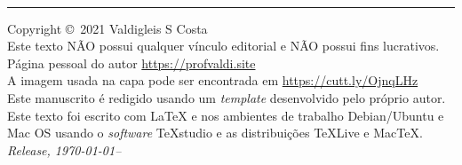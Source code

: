 
\newpage
~\vfill
\thispagestyle{empty}

\hrule
\vspace*{1cm}
\noindent Copyright \copyright\ 2021 Valdigleis S Costa\\ %

\noindent Este texto  \textsc{NÃO}  possui qualquer vínculo editorial e \textsc{NÃO} possui fins lucrativos.\\ %

\noindent Página pessoal do autor \url{https://profvaldi.site}\\ 

\noindent A imagem usada na capa pode ser encontrada em \url{https://cutt.ly/OjnqLHz}\\


\noindent Este manuscrito é redigido usando um \textit{template} desenvolvido pelo próprio autor. Este texto foi escrito com {\LaTeX} e {\LaTeXe} nos ambientes de trabalho Debian/Ubuntu e Mac OS usando o \textit{software} TeXstudio e as distribuições  {\TeX}Live e Mac{\TeX}. \\ 

\noindent \textit{Release, \today--\currenttime} %
\newpage